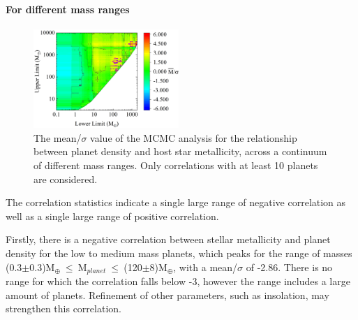 \documentclass[a4paper,twocolumn,12pt]{article}
\begin{document}
\paragraph{For different mass ranges}
\begin{figure}[h!]
    \centering
    \includegraphics[width=0.49\textwidth]{Graphs/FeH vs Density correlations - Mass ranges.png}
    \caption{The mean/$\sigma$ value of the MCMC analysis for the relationship between planet density and host star metallicity, across a continuum of different mass ranges. Only correlations with at least 10 planets are considered.}
    \label{figure: Fe/H vs Density correlations - Mass ranges (All)}
\end{figure}



The correlation statistics indicate a single large range of negative correlation as well as a single large range of positive correlation.

Firstly, there is a negative correlation between stellar metallicity and planet density for the low to medium mass planets, which peaks for the range of masses (0.3$\pm$0.3)M$_{\oplus}~\leq~$M$_{planet}~\leq~$(120$\pm$8)M$_{\oplus}$, with a mean/$\sigma$ of -2.86. There is no range for which the correlation falls below -3, however the range includes a large amount of planets. Refinement of other parameters, such as insolation, may strengthen this correlation.
\end{document}
